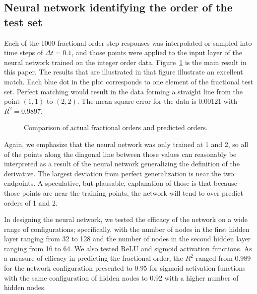 \subsection{Neural network identifying the order of the test set}

Each of the 1000 fractional order step responses was interpolated or sampled
into time steps of $\Delta t = 0.1$, and those points were applied to the input
layer of the neural network trained on the integer order data.
Figure~\ref{fig:accuracy} is the main result in this paper.  The results that
are illustrated in that figure illustrate an excellent match. Each blue dot in
the plot corresponds to one element of the fractional test set.  Perfect
matching would result in the data forming a straight line from the point $(1,1)$
to $(2,2)$. The mean square error for the data is 0.00121 with $R^2 = 0.9897$.

\begin{figure}
\centering

\vspace*{-5pt}
\caption{Comparison of actual fractional orders and predicted orders.}
\label{fig:accuracy}
\end{figure}

Again, we emphasize that the neural network was only trained at 1 and 2, so all
of the points along the diagonal line between those values can reasonably be
interpreted as a result of the neural network generalizing the definition of the
derivative. The largest deviation from perfect generalization is near the two
endpoints. A speculative, but plausable, explanation of those is that because
those points are near the training points, the network will tend to over predict
orders of 1 and 2.

In designing the neural network, we tested the efficacy of the network on a wide
range of configurations; specifically, with the number of nodes in the first
hidden layer ranging from 32 to 128 and the number of nodes in the second hidden layer
ranging from 16 to 64. We also tested ReLU and sigmoid activation functions. As
a measure of efficacy in predicting the fractional order, the $R^2$ ranged from
0.989 for the network configuration presented to 0.95 for sigmoid activation
functions with the same configuration of hidden nodes to 0.92 with a higher
number of hidden nodes. 
